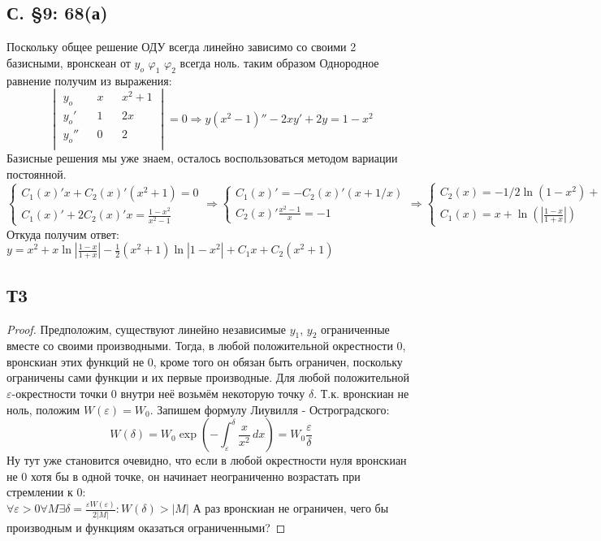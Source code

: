 \documentclass{article}
\begin{document}
\subsection{С. \S9: 68(а)}
Поскольку общее решение ОДУ всегда линейно зависимо со своими 2 базисными, вронскеан от $y_o$ $\varphi_1$ $\varphi_2$ всегда ноль. таким образом Однородное равнение получим из выражения:
\begin{equation}
\begin{vmatrix}
y_o  && x && x^2+1 \\
y_o' && 1 && 2x \\
y_o'' && 0 && 2 \\
\end{vmatrix}
=0    \Rightarrow
y (x^2-1)'' - 2x y' + 2y = 1-x^2
\end{equation}
Базисные решения мы уже знаем, осталось воспользоваться методом вариации постоянной.
\begin{equation}
    \begin{cases}
        C_1(x)'x+C_2(x)'(x^2+1)=0 \\
        C_1(x)'+ 2C_2(x)'x=\frac{1-x^2}{x^2-1}
    \end{cases}
    \Rightarrow
    \begin{cases}
        C_1(x)'=-C_2(x)'(x+1/x) \\
        C_2(x)' \frac{x^2-1}{x}=-1
    \end{cases}
    \Rightarrow
    \begin{cases}
    C_2(x)=-1/2 \ln (1-x^2) + C_2\\
    C_1(x)=x+\ln(|\frac{1-x}{1+x}|)
    \end{cases}
\end{equation}
Откуда получим ответ: $y=x^2 + x\ln|\frac{1-x}{1+x}| - \frac{1}{2} (x^2+1) \ln|1-x^2|  +  C_1 x + C_2 (x^2+1)$

\subsection{Т3} 
\begin{proof}
Предположим, существуют линейно независимые $y_1$, $y_2$ ограниченные вместе со своими производными. Тогда, в любой положительной окрестности 0, вронскиан этих функций не 0, кроме того он обязан быть ограничен, поскольку ограничены сами функции и их первые производные. Для любой положительной $\varepsilon$-окрестности точки 0 внутри неё возьмём некоторую точку $\delta$. Т.к. вронскиан не ноль, положим $W(\varepsilon)=W_0$. Запишем формулу Лиувилля - Остроградского:
\begin{equation}
    W(\delta)=W_0 \exp \left(- \int^{\delta}_{\varepsilon} \frac{x}{x^2} \, dx  \right) = W_0 \frac{\varepsilon}{\delta}
\end{equation}
Ну тут уже становится очевидно, что если в любой окрестности нуля вронскиан не 0 хотя бы в одной точке, он начинает неограниченно возрастать при стремлении к 0:\\
$\forall  \varepsilon > 0 \forall M \exists \delta =  \frac{\varepsilon W(\varepsilon)}{2|M|}: W(\delta)>|M|$
А раз вронскиан не ограничен, чего бы производным и функциям оказаться ограниченными?
\end{proof}
\end{document}
